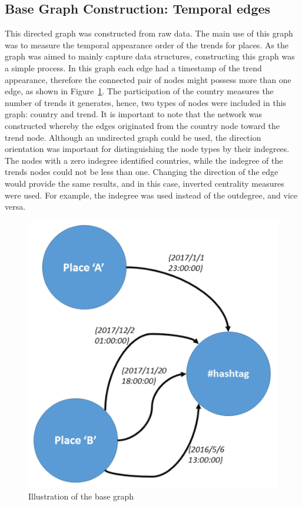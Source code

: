 \documentclass[utf8]{frontiersSCNS} %
\begin{document}
\subsection{Base Graph Construction: Temporal edges}

This directed graph was constructed from raw data. The main use of this graph was to measure the temporal appearance order of the trends for places. As the graph was aimed to mainly capture data structures, constructing this graph was a simple process.  In this graph each edge had a timestamp of the trend appearance, therefore the connected pair of nodes might possess more than one edge, as shown in Figure~\ref{fig:basegraph}. The participation of the country measures the number of trends it generates, hence, two types of nodes were included in this graph: country and trend. It is important to note that the network was constructed whereby the edges originated from the country node toward the trend node. Although an undirected graph could be used, the direction orientation was important for distinguishing the node types by their indegrees. The nodes with a zero indegree identified countries, while the indegree of the trends nodes could not be less than one. Changing the direction of the edge would provide the same results, and in this case, inverted centrality measures were used. For example, the indegree was used instead of the outdegree, and vice versa.

\begin{figure}[htb] \centering
\includegraphics[width=\columnwidth]{images/base_graph.png}
\caption{Illustration of the base graph}
\label{fig:basegraph}
\end{figure}
\end{document}
